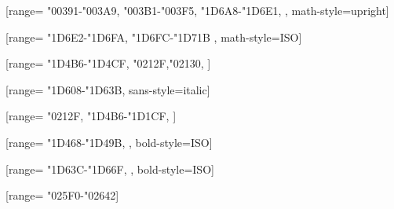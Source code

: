 \usepackage{polyglossia}

\usepackage{textcomp}

\usepackage{xltxtra}


\usepackage{unicode-math}


	[range={
		"00391-"003A9,		%
		"003B1-"003F5,		%
		"1D6A8-"1D6E1,	%
	}, math-style=upright]

	[range={
		"1D6E2-"1D6FA,		%
		"1D6FC-"1D71B		%
	}, math-style=ISO]

	[range={
		"1D4B6-"1D4CF,
		"0212F,"02130, %
	}]

	[range={
		"1D608-"1D63B},		%
		sans-style=italic]

	[range={
		"0212F,				%
		"1D4B6-"1D1CF,		%
	}]

	[range={
		"1D468-"1D49B,		%
	}, bold-style=ISO]

	[range={
		"1D63C-"1D66F,		%
	}, bold-style=ISO]

	[range={
		"025F0-"02642}] %


\usepackage{xeCJK}

